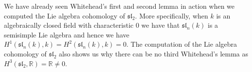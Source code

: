 We have already seen Whitehead's first and second lemma in action when we computed the Lie algebra cohomology of $ \mathfrak{sl}_2 $. More specifically, when $ k $ is an algebraically closed field with characteristic 0 we have that $ \mathfrak{sl}_n(k) $ is a semisimple Lie algebra and hence we have $ H^1(\mathfrak{sl}_n(k), k) = H^2(\mathfrak{sl}_n(k), k) = 0 $. The computation of the Lie algebra cohomology of $ \mathfrak{sl}_2 $ also shows us why there can be no third Whitehead's lemma as $ H^3(\mathfrak{sl}_2, \mathbb{R}) = \mathbb{R} \neq 0 $.
